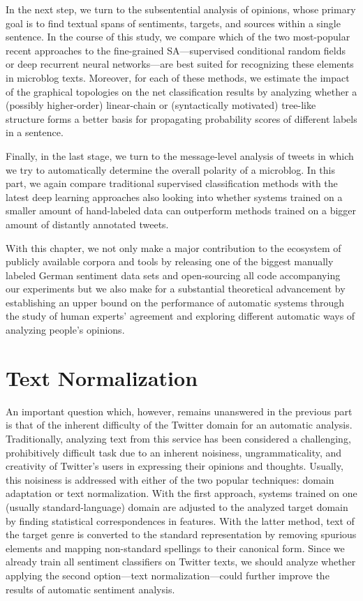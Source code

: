 \documentclass{article}
\begin{document}
In the next step, we turn to the subsentential analysis of opinions,
whose primary goal is to find textual spans of sentiments, targets,
and sources within a single sentence.  In the course of this study, we
compare which of the two most-popular recent approaches to the
fine-grained SA---supervised conditional random fields or deep
recurrent neural networks---are best suited for recognizing these
elements in microblog texts.  Moreover, for each of these methods, we
estimate the impact of the graphical topologies on the net
classification results by analyzing whether a (possibly higher-order)
linear-chain or (syntactically motivated) tree-like structure forms a
better basis for propagating probability scores of different labels in
a sentence.

Finally, in the last stage, we turn to the message-level analysis of
tweets in which we try to automatically determine the overall polarity
of a microblog.  In this part, we again compare traditional supervised
classification methods with the latest deep learning approaches also
looking into whether systems trained on a smaller amount of
hand-labeled data can outperform methods trained on a bigger amount of
distantly annotated tweets.

With this chapter, we not only make a major contribution to the
ecosystem of publicly available corpora and tools by releasing one of
the biggest manually labeled German sentiment data sets and
open-sourcing all code accompanying our experiments but we also make
for a substantial theoretical advancement by establishing an upper
bound on the performance of automatic systems through the study of
human experts' agreement and exploring different automatic ways of
analyzing people's opinions.

\section*{Text Normalization}
An important question which, however, remains unanswered in the
previous part is that of the inherent difficulty of the Twitter domain
for an automatic analysis.  Traditionally, analyzing text from this
service has been considered a challenging, prohibitively difficult
task due to an inherent noisiness, ungrammaticality, and creativity of
Twitter's users in expressing their opinions and thoughts.  Usually,
this noisiness is addressed with either of the two popular techniques:
domain adaptation or text normalization.  With the first approach,
systems trained on one (usually standard-language) domain are adjusted
to the analyzed target domain by finding statistical correspondences
in features.  With the latter method, text of the target genre is
converted to the standard representation by removing spurious elements
and mapping non-standard spellings to their canonical form.  Since we
already train all sentiment classifiers on Twitter texts, we should
analyze whether applying the second option---text
normalization---could further improve the results of automatic
sentiment analysis.
\end{document}

